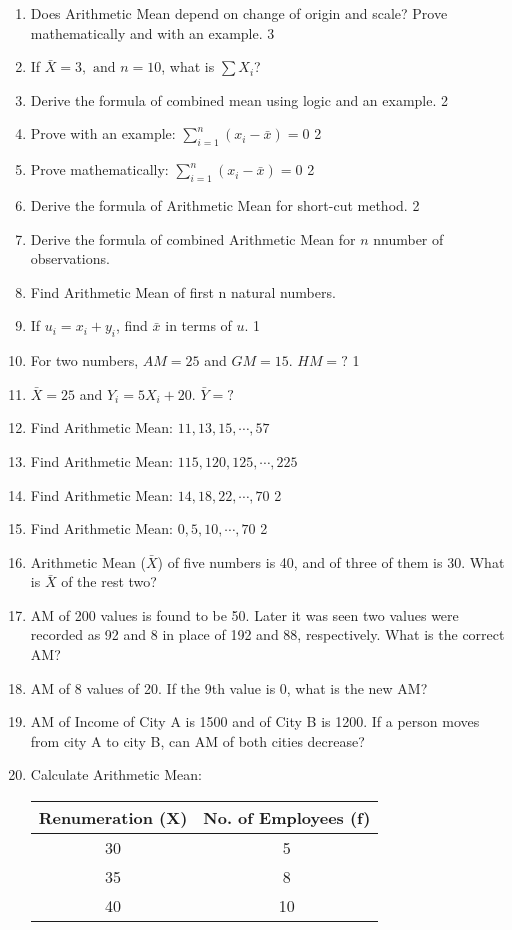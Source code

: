 \documentclass[a4paper,oneside]{book}
\begin{document}
\begin{enumerate}
    \item Does Arithmetic Mean depend on change of origin and 
    scale? Prove mathematically and with an example. \hfill 3
    \item If $\bar{X} = 3 , \text{ and } n = 10$, what is $\sum X_i$?
    \item Derive the formula of combined mean using logic and an example. \hfill 2
    \item Prove with an example: $\displaystyle \sum_{i=1}^n (x_i-\bar x) = 0$ \hfill 2
    \item Prove mathematically: $\displaystyle \sum_{i=1}^n (x_i-\bar x) = 0$ \hfill 2
    \item Derive the formula of Arithmetic Mean for short-cut method. \hfill 2
    \item Derive the formula of combined Arithmetic Mean for $n$ nnumber of observations.
    \item Find Arithmetic Mean of first n natural numbers.
    \item If $u_i = x_i + y_i$, find $\bar x$ in terms of $u$. \hfill 1
    \item For two numbers, $AM=25$ and $GM=15$. $HM=?$ \hfill 1
    \item $\bar X = 25$ and $Y_i = 5X_i + 20$. $\bar Y = ?$
    \item Find Arithmetic Mean: $11,13,15, \cdots, 57$
    \item Find Arithmetic Mean: $115,120,125, \cdots, 225$
    \item Find Arithmetic Mean: $14,18,22, \cdots, 70$ \hfill 2
    \item Find Arithmetic Mean: $0, 5, 10, \cdots, 70$ \hfill 2
    \item Arithmetic Mean ($\bar X$) of five numbers is 40, and of three of them is 30. What is $\bar X$ of the rest two?
    \item AM of 200 values is found to be 50. Later it was seen two values were recorded as 92 and 8 in place of 192 and 88, respectively. What is the correct AM?
    \item AM of 8 values of 20. If the 9th value is 0, what is the new AM?
    \item AM of Income of City A is 1500 and of City B is 1200. If a person moves from city A to city B, can AM of both cities decrease?
    \item Calculate Arithmetic Mean:
    
    \begin{table}[h]
    \centering
\begin{tabular}{c|c}
\textbf{Renumeration (X)} & \textbf{No. of Employees (f)} \\ \hline
30               & 5                    \\ \hline
35               & 8                    \\ \hline
40               & 10                  
\end{tabular}
\end{table}
    

\end{enumerate}
\end{document}
